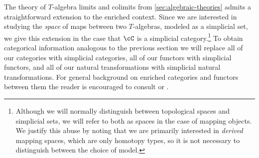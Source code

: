 \documentclass[leqno,oneside,english]{elsarticle}
\begin{document}
The theory of $T$-algebra limits and colimits from
\cref{sec:algebraic-theories} admits a straightforward extension to
the enriched context. Since we are interested in studying the \emph{space} of maps between
two $T$-algebras, modeled as a simplicial set, we give this extension
in the case that $\cC$ is a simplicial category.\footnote{Although we
  will normally distinguish between topological spaces and simplicial
  sets, we will refer to both as spaces in the case of mapping
  objects. We justify this abuse by noting that we are primarily
  interested in \emph{derived} mapping spaces, which are only 
  homotopy types, so it is not necessary to distinguish between
  the choice of model.} To obtain categorical information analogous to
the previous section we will replace all of our categories with
simplicial categories, all of our functors with simplicial functors,
and all of our natural transformations with simplicial natural
transformations. For general background
on enriched categories and functors between them the reader is
encouraged to consult \cite[\S~6.2]{Bor94a} or \cite{Kel05}.
\end{document}
